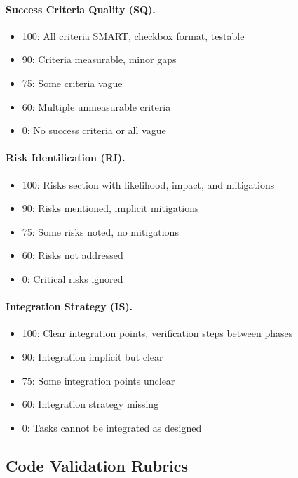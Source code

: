 \paragraph{Success Criteria Quality (SQ).}
\begin{itemize}
    \item 100: All criteria SMART, checkbox format, testable
    \item 90: Criteria measurable, minor gaps
    \item 75: Some criteria vague
    \item 60: Multiple unmeasurable criteria
    \item 0: No success criteria or all vague
\end{itemize}

\paragraph{Risk Identification (RI).}
\begin{itemize}
    \item 100: Risks section with likelihood, impact, and mitigations
    \item 90: Risks mentioned, implicit mitigations
    \item 75: Some risks noted, no mitigations
    \item 60: Risks not addressed
    \item 0: Critical risks ignored
\end{itemize}

\paragraph{Integration Strategy (IS).}
\begin{itemize}
    \item 100: Clear integration points, verification steps between phases
    \item 90: Integration implicit but clear
    \item 75: Some integration points unclear
    \item 60: Integration strategy missing
    \item 0: Tasks cannot be integrated as designed
\end{itemize}

\subsection{Code Validation Rubrics}


